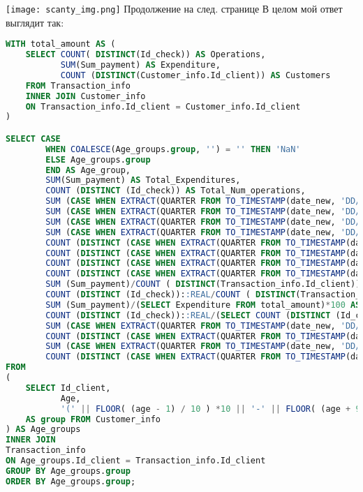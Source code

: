 \documentclass[12pt, a3paper]{article}
\begin{document}
\noindent
\texttt{[image: scanty\_img.png]}
Продолжение на след. странице
\newpage
В целом мой ответ выглядит так:
\begin{lstlisting}[language=SQL]
WITH total_amount AS (
    SELECT COUNT( DISTINCT(Id_check)) AS Operations,
           SUM(Sum_payment) AS Expenditure,
           COUNT (DISTINCT(Customer_info.Id_client)) AS Customers
    FROM Transaction_info
    INNER JOIN Customer_info
    ON Transaction_info.Id_client = Customer_info.Id_client
)

SELECT CASE
		WHEN COALESCE(Age_groups.group, '') = '' THEN 'NaN' 
        ELSE Age_groups.group
        END AS Age_group,
        SUM(Sum_payment) AS Total_Expenditures,
        COUNT (DISTINCT (Id_check)) AS Total_Num_operations,
		SUM (CASE WHEN EXTRACT(QUARTER FROM TO_TIMESTAMP(date_new, 'DD/MM/YYYY')) = 1 THEN Sum_payment END) AS Q1_exp,
		SUM (CASE WHEN EXTRACT(QUARTER FROM TO_TIMESTAMP(date_new, 'DD/MM/YYYY')) = 2 THEN Sum_payment END) AS Q2_exp,
		SUM (CASE WHEN EXTRACT(QUARTER FROM TO_TIMESTAMP(date_new, 'DD/MM/YYYY')) = 3 THEN Sum_payment END) AS Q3_exp,
		SUM (CASE WHEN EXTRACT(QUARTER FROM TO_TIMESTAMP(date_new, 'DD/MM/YYYY')) = 4 THEN Sum_payment END) AS Q4_exp,
		COUNT (DISTINCT (CASE WHEN EXTRACT(QUARTER FROM TO_TIMESTAMP(date_new, 'DD/MM/YYYY')) = 1 THEN Id_check END)) AS Q1_op,
		COUNT (DISTINCT (CASE WHEN EXTRACT(QUARTER FROM TO_TIMESTAMP(date_new, 'DD/MM/YYYY')) = 2 THEN Id_check END)) AS Q2_op,
		COUNT (DISTINCT (CASE WHEN EXTRACT(QUARTER FROM TO_TIMESTAMP(date_new, 'DD/MM/YYYY')) = 3 THEN Id_check END)) AS Q3_op,
		COUNT (DISTINCT (CASE WHEN EXTRACT(QUARTER FROM TO_TIMESTAMP(date_new, 'DD/MM/YYYY')) = 4 THEN Id_check END)) AS Q4_op,
		SUM (Sum_payment)/COUNT ( DISTINCT(Transaction_info.Id_client)) AS Avg_total_Exp,
		COUNT (DISTINCT (Id_check))::REAL/COUNT ( DISTINCT(Transaction_info.Id_client)) AS Avg_total_op,
		SUM (Sum_payment)/(SELECT Expenditure FROM total_amount)*100 AS Exp_ratio,
		COUNT (DISTINCT (Id_check))::REAL/(SELECT COUNT (DISTINCT (Id_check)) FROM Transaction_info)*100 AS Op_ratio,
		SUM (CASE WHEN EXTRACT(QUARTER FROM TO_TIMESTAMP(date_new, 'DD/MM/YYYY')) = 1 THEN Sum_payment END)/COUNT ( DISTINCT(CASE WHEN EXTRACT(QUARTER FROM TO_TIMESTAMP(date_new, 'DD/MM/YYYY')) = 1 THEN Transaction_info.Id_client END)) AS Q1_avg_exp,
		COUNT (DISTINCT (CASE WHEN EXTRACT(QUARTER FROM TO_TIMESTAMP(date_new, 'DD/MM/YYYY')) = 1 THEN Id_check END))::REAL/COUNT ( DISTINCT(CASE WHEN EXTRACT(QUARTER FROM TO_TIMESTAMP(date_new, 'DD/MM/YYYY')) = 1 THEN Transaction_info.Id_client END)) AS Q1_avg_op,
		SUM (CASE WHEN EXTRACT(QUARTER FROM TO_TIMESTAMP(date_new, 'DD/MM/YYYY')) = 1 THEN Sum_payment END)/SUM (Sum_payment)*100 AS Q1_exp_ratio,
		COUNT (DISTINCT (CASE WHEN EXTRACT(QUARTER FROM TO_TIMESTAMP(date_new, 'DD/MM/YYYY')) = 1 THEN Id_check END))::REAL/COUNT (DISTINCT (Id_check)) AS Q1_op_ratio
FROM
(
    SELECT Id_client, 
           Age, 
           '(' || FLOOR( (age - 1) / 10 ) *10 || '-' || FLOOR( (age + 9) / 10 ) * 10 || ')' 
    AS group FROM Customer_info
) AS Age_groups
INNER JOIN 
Transaction_info
ON Age_groups.Id_client = Transaction_info.Id_client
GROUP BY Age_groups.group
ORDER BY Age_groups.group;
\end{lstlisting}
\end{document}
